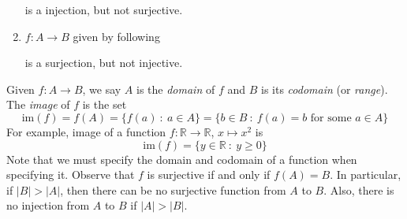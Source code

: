 \documentclass[10pt, a4paper, twoside]{report}
\begin{document}
\begin{example}
\begin{enumerate}
\begin{figure}[H]
        \end{figure}
        is a injection, but not surjective.
        \item \(f:A\to B\) given by following
        \begin{figure}[H]
            \centering
        \end{figure}
        is a surjection, but not injective.
    \end{enumerate}
\end{example}

Given \(f:A\to B\), we say \(A\) is the \emph{domain} of \(f\) and \(B\) is its \emph{codomain} (or \emph{range}). The \emph{image} of \(f\) is the set 
\[\text{im}(f)=f(A)=\{f(a)\::\:a\in A\}=\{b\in B\::\:f(a)=b\text{  for some  }a\in A\}\]
For example, image of a function \(f:\mathbb{R}\to\mathbb{R}\), \(x\mapsto x^2\) is 
\[\text{im}(f)=\{y\in\mathbb{R}\::\:y\geq 0\}\]
Note that we must specify the domain and codomain of a function when specifying it. Observe that \(f\) is surjective if and only if \(f(A)=B\). In particular, if \(|B|>|A|\), then there can be no surjective function from \(A\) to \(B\). Also, there is no injection from \(A\) to \(B\) if \(|A|>|B|\).
\end{document}
